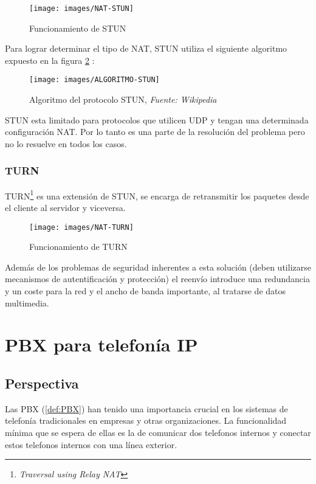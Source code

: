 \begin{figure}[!h]
  \centering
  \texttt{[image: images/NAT-STUN]}
  \caption{Funcionamiento de STUN}
  \label{fig:STUN-funcionamiento}
\end{figure}

Para lograr determinar el tipo de NAT, STUN utiliza el siguiente algoritmo expuesto en la figura \ref{fig:STUN-Algoritmo} :

\begin{figure}[!h]
  \centering
  \texttt{[image: images/ALGORITMO-STUN]}
  \caption{Algoritmo del protocolo STUN, \emph{Fuente: Wikipedia}}
  \label{fig:STUN-Algoritmo}
\end{figure}

STUN esta limitado para protocolos que utilicen UDP y tengan una determinada configuración NAT. Por lo tanto es una parte de la resolución del problema pero no lo resuelve en todos los casos.

\subsubsection{TURN}
\label{sec:servidor-turn}

TURN\footnote{\emph{Traversal using Relay NAT}} es una extensión de STUN, se encarga de retransmitir los paquetes desde el cliente al servidor y viceversa.

\begin{figure}[!h]
  \centering
  \texttt{[image: images/NAT-TURN]}
  \caption{Funcionamiento de TURN}
  \label{fig:TURN-funcionamiento}
\end{figure}

Además de los problemas de seguridad inherentes a esta solución (deben utilizarse mecanismos de autentificación y protección) el reenvío introduce una redundancia y un coste para la red y el ancho de banda importante, al tratarse de datos multimedia.


\section{PBX para telefonía IP}
\label{sec:pbx}

\subsection{Perspectiva}
\label{sec:perspectiva}

Las PBX (\ref{def:PBX}) han tenido una importancia crucial en los sistemas de telefonía tradicionales en empresas y otras organizaciones. La funcionalidad mínima que se espera de ellas es la de comunicar dos telefonos internos y conectar estos telefonos internos con una línea exterior. 

